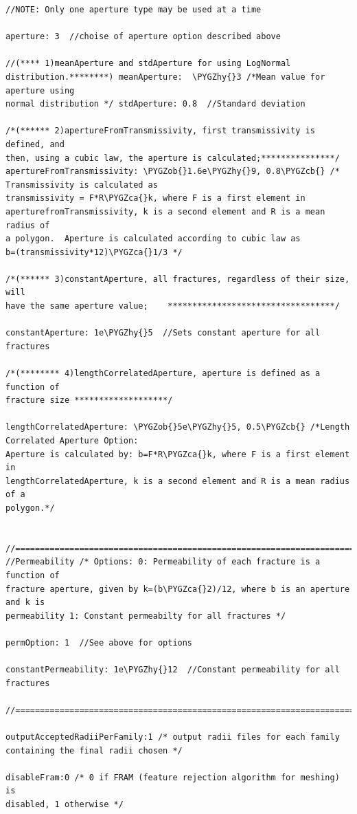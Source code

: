 \documentclass[letterpaper,10pt,english]{sphinxmanual}
\def\PYGZob{\char`\{}
\def\PYGZcb{\char`\}}
\def\PYGZca{\char`\^}
\def\PYGZhy{\char`\-}
\begin{document}
\begin{Verbatim}[commandchars=\\\{\}]
//NOTE: Only one aperture type may be used at a time

aperture: 3  //choise of aperture option described above

//(**** 1)meanAperture and stdAperture for using LogNormal
distribution.********) meanAperture:  \PYGZhy{}3 /*Mean value for aperture using
normal distribution */ stdAperture: 0.8  //Standard deviation

/*(****** 2)apertureFromTransmissivity, first transmissivity is defined, and
then, using a cubic law, the aperture is calculated;***************/
apertureFromTransmissivity: \PYGZob{}1.6e\PYGZhy{}9, 0.8\PYGZcb{} /* Transmissivity is calculated as
transmissivity = F*R\PYGZca{}k, where F is a first element in
aperturefromTransmissivity, k is a second element and R is a mean radius of
a polygon.  Aperture is calculated according to cubic law as
b=(transmissivity*12)\PYGZca{}1/3 */

/*(****** 3)constantAperture, all fractures, regardless of their size, will
have the same aperture value;    **********************************/

constantAperture: 1e\PYGZhy{}5  //Sets constant aperture for all fractures

/*(******** 4)lengthCorrelatedAperture, aperture is defined as a function of
fracture size *******************/

lengthCorrelatedAperture: \PYGZob{}5e\PYGZhy{}5, 0.5\PYGZcb{} /*Length Correlated Aperture Option:
Aperture is calculated by: b=F*R\PYGZca{}k, where F is a first element in
lengthCorrelatedAperture, k is a second element and R is a mean radius of a
polygon.*/


//============================================================================
//Permeability /* Options: 0: Permeability of each fracture is a function of
fracture aperture, given by k=(b\PYGZca{}2)/12, where b is an aperture and k is
permeability 1: Constant permeabilty for all fractures */

permOption: 1  //See above for options

constantPermeability: 1e\PYGZhy{}12  //Constant permeability for all fractures

//=============================================================================

outputAcceptedRadiiPerFamily:1 /* output radii files for each family
containing the final radii chosen */

disableFram:0 /* 0 if FRAM (feature rejection algorithm for meshing) is
disabled, 1 otherwise */


\end{Verbatim}
\end{document}
